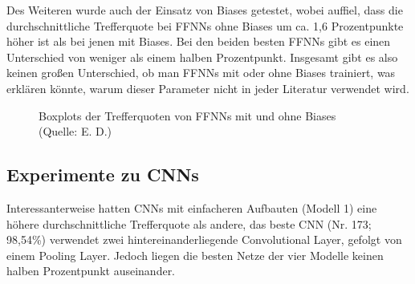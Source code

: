\documentclass[
	a4paper,
	12pt,
	ngerman,
	oneside
]{scrreprt}											%
\begin{document}
				Des Weiteren wurde auch der Einsatz von Biases getestet, wobei auffiel, dass die durchschnittliche Trefferquote bei FFNNs ohne Biases um ca. 1,6 Prozentpunkte höher ist als bei jenen mit Biases. Bei den beiden besten FFNNs gibt es einen Unterschied von weniger als einem halben Prozentpunkt. Insgesamt gibt es also keinen großen Unterschied, ob man FFNNs mit oder ohne Biases trainiert, was erklären könnte, warum dieser Parameter nicht in jeder Literatur verwendet wird. 
	
				\begin{figure}[h] 
					\begin{scriptsize}
					\end{scriptsize}
					\vspace{-5mm}
					\caption{Boxplots der Trefferquoten von FFNNs mit und ohne Biases \\ (Quelle: E. D.)}
				\end{figure}
	
			\subsection{Experimente zu CNNs}
				Interessanterweise hatten CNNs mit einfacheren Aufbauten (Modell 1) eine höhere durchschnittliche Trefferquote als andere, das beste CNN (Nr. 173; 98,54\%) verwendet zwei hintereinanderliegende Convolutional Layer, gefolgt von einem Pooling Layer. Jedoch liegen die besten Netze der vier Modelle keinen halben Prozentpunkt auseinander. 
				
\end{document}
